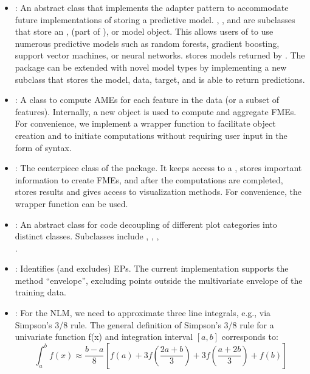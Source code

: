 \begin{itemize}
\item {}: An abstract class that implements the adapter pattern to accommodate future implementations of storing a predictive model. , , and  are subclasses that store an ,  \citep{parsnip} (part of ), or   model object. This allows users of  to use numerous predictive models such as random forests, gradient boosting, support vector machines, or neural networks.  stores models returned by . The package can be extended with novel model types by implementing a new subclass that stores the model, data, target, and is able to return predictions. 
\item {}: A class to compute AMEs for each feature in the data (or a subset of features). Internally, a new  object is used to compute and aggregate FMEs. For convenience, we implement a wrapper function  to facilitate object creation and to initiate computations without requiring user input in the form of  syntax. 
\item {}: The centerpiece class of the package. It keeps access to a , stores important information to create FMEs, and after the computations are completed, stores results and gives access to visualization methods. For convenience, the wrapper function  can be used.
\item {}: An abstract class for code decoupling of different plot categories into distinct classes. Subclasses include , , , \\.
\item {}:
Identifies (and excludes) EPs. The current implementation supports the method \enquote{envelope}, excluding points outside the multivariate envelope of the training data.
\item {}: For the NLM, we need to approximate three line integrals, e.g., via Simpson's 3/8 rule. The general definition of Simpson's 3/8 rule for a univariate function f(x) and integration interval $[a, b]$ corresponds to:
\begin{equation}
\label{simpson}
\int_{a}^{b} f(x) \approx \frac{b-a}{8}\left[ f(a) + 3f\left(\frac{2a+b}{3}\right) + 3f\left(\frac{a+2b}{3}\right) + f(b) \right]

\end{equation}
\end{itemize}
